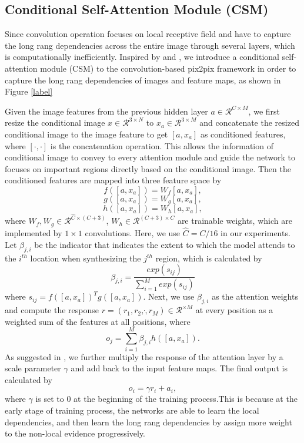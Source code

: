 \subsection{Conditional Self-Attention Module (CSM)}
Since convolution operation focuses on local receptive field and have to capture the long rang dependencies across the entire image through several layers, which is computationally inefficiently. Inspired by \cite{non-local} and \cite{SAGANs}, we introduce a conditional self-attention module (CSM) to the convolution-based pix2pix framework in order to capture the long rang dependencies of images and feature maps, as shown in Figure \ref{label}

Given the image features from the previous hidden layer $a\in \mathcal{R}^{C\times M}$, we first resize the conditional image $x\in \mathcal{R}^{3\times N}$ to  $x_a\in \mathcal{R}^{3\times M}$ and concatenate the resized conditional image to the image feature to get $[a, x_a]$ as conditioned features, where $[\cdot,\cdot]$ is the concatenation operation. This allows the information of conditional image to convey to every attention module and guide the network to focuses on important regions directly based on the conditional image.
%
Then the conditioned features are mapped into three feature space by
\begin{equation}
\label{eqn:f}
f([a, x_a])=W_f[a, x_a],
\end{equation}
\begin{equation}
\label{eqn:g}
g([a, x_a])=W_g[a, x_a],
\end{equation}
\begin{equation}
\label{eqn:h}
h([a, x_a])=W_h[a, x_a],
\end{equation}
where $W_f, W_g\in \mathcal{R}^{\hat{C}\times (C+3)}$, $W_h\in \mathcal{R}^{(C+3)\times C}$ are trainable weights, which are implemented by $1\times 1$ convolutions. Here, we use $\hat{C}=C/16$ in our experiments. 
%
Let $\beta_{j,i}$ be the indicator that indicates the extent to which the model attends to the $i^{th}$ location when synthesizing the $j^{th}$ region, which is calculated by 
\begin{equation}
\label{eqn:beta}
\beta_{j,i}=\frac{exp(s_{ij})}{\sum^M_{i=1}exp(s_{ij})}
\end{equation}
where $s_{ij}=f([a, x_a])^Tg([a, x_a])$. Next, we use $\beta_{j,i}$ as the attention weights and compute the response $r=(r_1, r_2,\dot, r_M)\in \mathcal{R}^{\times M}$ at every position as a weighted sum of the features at all positions, where
\begin{equation}
\label{eqn:response}
o_j=\sum^M_{i=1}\beta_{j,i}h([a, x_a]).
\end{equation}
As suggested in \cite{SAGANs}, we further multiply the response of the attention layer by a scale parameter $\gamma$ and add back to the input feature maps. The final output is calculated by 
\begin{equation}
\label{eqn:output}
o_i=\gamma r_i+a_i,
\end{equation}
where $\gamma$ is set to $0$ at the beginning of the training process.This is because at the early stage of training process, the networks are able to learn the local dependencies, and then learn the long rang dependencies by assign more weight to the non-local evidence progressively.
%
%
